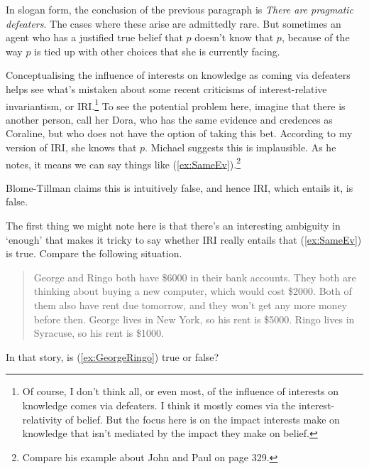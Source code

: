 In slogan form, the conclusion of the previous paragraph is \textit{There are pragmatic defeaters}. The cases where these arise are admittedly rare. But sometimes an agent who has a justified true belief that \(p\) doesn't know that \(p\), because of the way \(p\) is tied up with other choices that she is currently facing.

Conceptualising the influence of interests on knowledge as coming via defeaters helps see what's mistaken about some recent criticisms of interest-relative invariantism, or IRI.\footnote{Of course, I don't think all, or even most, of the influence of interests on knowledge comes via defeaters. I think it mostly comes via the interest-relativity of belief. But the focus here is on the impact interests make on knowledge that isn't mediated by the impact they make on belief.} To see the potential problem here, imagine that there is another person, call her Dora, who has the same evidence and credences as Coraline, but who does not have the option of taking this bet. According to my version of IRI, she knows that \(p\). Michael \cite{MBT2009} suggests this is implausible. As he notes, it means we can say things like (\ref{ex:SameEv}).\footnote{Compare his example about John and Paul on page 329.}


\noindent Blome-Tillman claims this is intuitively false, and hence IRI, which entails it, is false.

The first thing we might note here is that there's an interesting ambiguity in `enough' that makes it tricky to say whether IRI really entails that (\ref{ex:SameEv}) is true. Compare the following situation.

\begin{quote}
George and Ringo both have \$6000 in their bank accounts. They both are thinking about buying a new computer, which would cost \$2000. Both of them also have rent due tomorrow, and they won't get any more money before then. George lives in New York, so his rent is \$5000. Ringo lives in Syracuse, so his rent is \$1000.
\end{quote}

\noindent In that story, is (\ref{ex:GeorgeRingo}) true or false?


